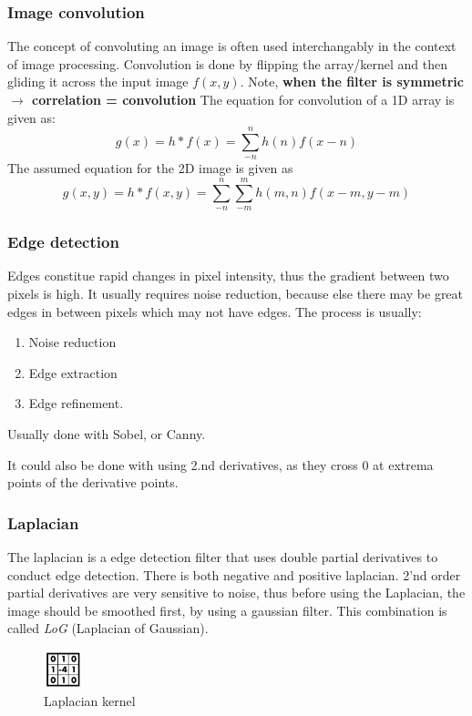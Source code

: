 \documentclass[a4paper]{article}
\begin{document}
\subsubsection*{Image convolution}
The concept of convoluting an image is often used interchangably in the context of image processing. Convolution is done by flipping the array/kernel and then gliding it across the input image $ f(x,y) $. Note, \textbf{when the filter is symmetric $\rightarrow$ correlation = convolution } 
The equation for convolution of a 1D array is given as:
\begin{equation}\label{eq:convolution}
	g(x) = h \ast f(x) = \sum_{-n}^{n}{h(n)f(x-n)}
\end{equation}
The assumed equation for the 2D image is given as 
\begin{equation}
g(x,y) = h \ast f(x,y) = \sum_{-n}^{n}{\sum_{-m}^{m}{h(m,n)f(x-m, y-m)}}
\end{equation}

\subsubsection*{Edge detection}
Edges constitue rapid changes in pixel intensity, thus the gradient between two pixels is high.
It usually requires noise reduction, because else there may be great edges in between pixels which may not have edges. 
The process is usually:
\begin{enumerate}
	\item Noise reduction
	\item Edge extraction
	\item Edge refinement.
\end{enumerate}
Usually done with Sobel, or Canny.

It could also be done with using 2.nd derivatives, as they cross 0 at extrema points of the derivative points. 
\subsubsection*{Laplacian}
The laplacian is a edge detection filter that uses double partial derivatives to conduct edge detection. There is both negative and positive laplacian. 2'nd order partial derivatives are very sensitive to noise, thus before using the Laplacian, the image should be smoothed first, by using a gaussian filter. This combination is called \textit{LoG} (Laplacian of Gaussian).  
\begin{figure}[H]
\centering
\includegraphics[width=0.1\textwidth]{figures/laplacian_kernel.png}
\caption{Laplacian kernel}
\label{fig:laplacian_kernel}
\end{figure} 
\end{document}
